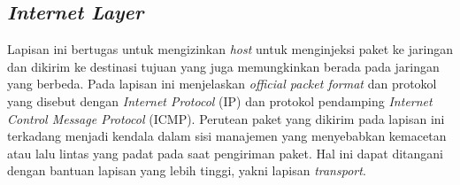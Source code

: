 
\subsection{\emph{Internet Layer}}

Lapisan ini bertugas untuk mengizinkan \emph{host} untuk menginjeksi paket ke jaringan dan dikirim ke destinasi tujuan yang juga memungkinkan berada pada jaringan yang berbeda. Pada lapisan ini menjelaskan \emph{official packet format} dan protokol yang disebut dengan \emph{Internet Protocol} (IP) dan protokol pendamping \emph{Internet Control Message Protocol} (ICMP). Perutean paket yang dikirim pada lapisan ini terkadang menjadi kendala dalam sisi manajemen yang menyebabkan kemacetan atau lalu lintas yang padat pada saat pengiriman paket. Hal ini dapat ditangani dengan bantuan lapisan yang lebih tinggi, yakni lapisan \emph{transport}.



